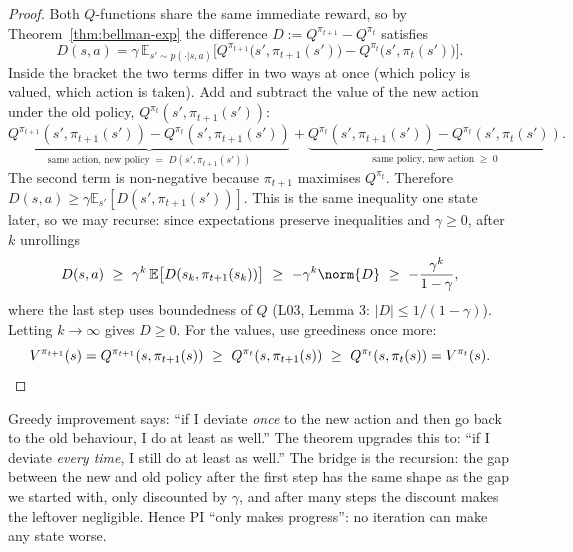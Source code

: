 \documentclass[11pt,a4paper]{article}
\newcommand{\E}{\mathbb{E}}
\theoremstyle{plain}
\theoremstyle{definition}
\theoremstyle{remark}
\begin{document}
\begin{proof}
Both $Q$-functions share the same immediate reward, so by Theorem~\ref{thm:bellman-exp} the difference $D:=Q^{\pi_{t+1}}-Q^{\pi_t}$ satisfies
\[
D(s,a)=\gamma\,\E_{s'\sim p(\cdot|s,a)}\Big[Q^{\pi_{t+1}}\big(s',\pi_{t+1}(s')\big)-Q^{\pi_t}\big(s',\pi_t(s')\big)\Big].
\]
Inside the bracket the two terms differ in two ways at once (which policy is valued, which action is taken). Add and subtract the value of the new action under the old policy, $Q^{\pi_t}(s',\pi_{t+1}(s'))$:
\[
\underbrace{Q^{\pi_{t+1}}(s',\pi_{t+1}(s'))-Q^{\pi_t}(s',\pi_{t+1}(s'))}_{\text{same action, new policy}\;=\;D(s',\pi_{t+1}(s'))}
+\underbrace{Q^{\pi_t}(s',\pi_{t+1}(s'))-Q^{\pi_t}(s',\pi_t(s'))}_{\text{same policy, new action}\;\ge\;0}.
\]
The second term is non-negative because $\pi_{t+1}$ maximises $Q^{\pi_t}$. Therefore $D(s,a)\ge\gamma\E_{s'}[D(s',\pi_{t+1}(s'))]$. This is the same inequality one state later, so we may recurse: since expectations preserve inequalities and $\gamma\ge0$, after $k$ unrollings
\[
D(s,a)\ \ge\ \gamma^k\,\E\big[D(s_k,\pi_{t+1}(s_k))\big]\ \ge\ -\gamma^k\norm{D}\ \ge\ -\frac{\gamma^k}{1-\gamma},
\]
where the last step uses boundedness of $Q$ (L03, Lemma 3: $|D|\le1/(1-\gamma)$). Letting $k\to\infty$ gives $D\ge0$. For the values, use greediness once more:
\[
V^{\pi_{t+1}}(s)=Q^{\pi_{t+1}}(s,\pi_{t+1}(s))\ \ge\ Q^{\pi_t}(s,\pi_{t+1}(s))\ \ge\ Q^{\pi_t}(s,\pi_t(s))=V^{\pi_t}(s).\qedhere
\]
\end{proof}

\begin{intuition}
Greedy improvement says: ``if I deviate \emph{once} to the new action and then go back to the old behaviour, I do at least as well.'' The theorem upgrades this to: ``if I deviate \emph{every time}, I still do at least as well.'' The bridge is the recursion: the gap between the new and old policy after the first step has the same shape as the gap we started with, only discounted by $\gamma$, and after many steps the discount makes the leftover negligible. Hence PI ``only makes progress'': no iteration can make any state worse.
\end{intuition}
\end{document}
